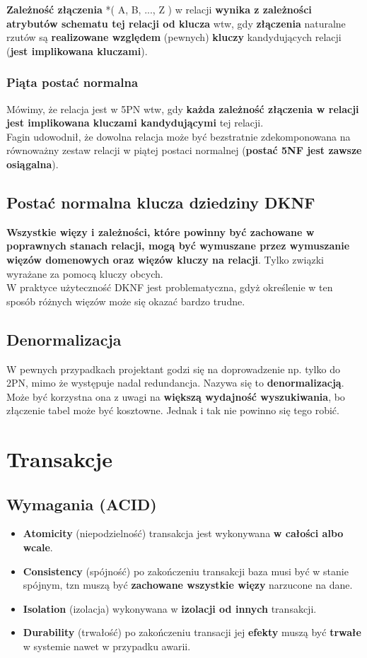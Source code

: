 \documentclass[a4paper]{article}
\begin{document}
\textbf{Zależność złączenia} *( A, B, ..., Z ) w relacji \textbf{wynika z zależności atrybutów schematu tej relacji od klucza} wtw, gdy \textbf{złączenia} naturalne rzutów są \textbf{realizowane względem} (pewnych) \textbf{kluczy} kandydujących relacji (\textbf{jest implikowana kluczami}).

\subsubsection{Piąta postać normalna}
Mówimy, że relacja jest w 5PN wtw, gdy \textbf{każda zależność złączenia w relacji jest implikowana kluczami kandydującymi} tej relacji.\\
Fagin udowodnił, że dowolna relacja może być bezstratnie zdekomponowana na równoważny zestaw relacji w piątej postaci normalnej (\textbf{postać 5NF jest zawsze osiągalna}).

\subsection{Postać normalna klucza dziedziny DKNF}
\textbf{Wszystkie więzy i zależności, które powinny być zachowane w poprawnych stanach relacji, mogą być wymuszane przez wymuszanie więzów domenowych oraz więzów kluczy na relacji}. Tylko związki wyrażane za pomocą kluczy obcych.\\
W praktyce użyteczność DKNF jest problematyczna, gdyż określenie w ten sposób różnych więzów może się okazać bardzo trudne.

\subsection{Denormalizacja}
W pewnych przypadkach projektant godzi się na doprowadzenie np. tylko do 2PN, mimo że występuje nadal redundancja. Nazywa się to \textbf{denormalizacją}. Może być korzystna ona z uwagi na \textbf{większą wydajność wyszukiwania}, bo złączenie tabel może być kosztowne. Jednak i tak nie powinno się tego robić.

\section{Transakcje}
\subsection{Wymagania (ACID)}
\begin{itemize}
    \item \textbf{Atomicity} (niepodzielność) transakcja jest wykonywana \textbf{w całości albo wcale}.
    \item \textbf{Consistency} (spójność) po zakończeniu transakcji baza musi być w stanie spójnym, tzn muszą być \textbf{zachowane wszystkie więzy} narzucone na dane.
    \item \textbf{Isolation} (izolacja) wykonywana w \textbf{izolacji od innych} transakcji.
    \item \textbf{Durability} (trwałość) po zakończeniu transacji jej \textbf{efekty} muszą być \textbf{trwałe} w systemie nawet w przypadku awarii.
\end{itemize}
\end{document}
